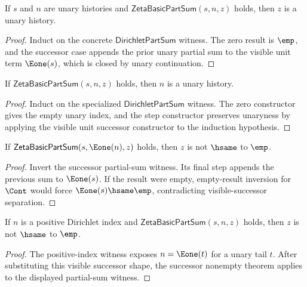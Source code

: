 \begin{theorem}
\label{thm:zeta-basic-part-sum-unary-result}
If \(s\) and \(n\) are unary histories and \(\mathsf{ZetaBasicPartSum}(s,n,z)\) holds, then \(z\) is a unary history.
\end{theorem}
\begin{proof}
Induct on the concrete \(\mathsf{DirichletPartSum}\) witness. The zero result is \(\emp\), and the successor case appends the prior unary partial sum to the visible unit term \(\Eone(s)\), which is closed by unary continuation.
\end{proof}

\begin{theorem}
\label{thm:zeta-basic-part-sum-index-unary}
If \(\mathsf{ZetaBasicPartSum}(s,n,z)\) holds, then \(n\) is a unary history.
\end{theorem}
\begin{proof}
Induct on the specialized \(\mathsf{DirichletPartSum}\) witness. The zero
constructor gives the empty unary index, and the step constructor preserves
unaryness by applying the visible unit successor constructor to the induction
hypothesis.
\end{proof}

\begin{theorem}
\label{thm:zeta-basic-part-sum-successor-result-nonempty}
If \(\mathsf{ZetaBasicPartSum}(s,\Eone(n),z)\) holds, then \(z\) is not
\(\hsame\) to \(\emp\).
\end{theorem}
\begin{proof}
Invert the successor partial-sum witness. Its final step appends the previous
sum to \(\Eone(s)\). If the result were empty, empty-result inversion for
\(\Cont\) would force \(\Eone(s)\hsame\emp\), contradicting visible-successor
separation.
\end{proof}

\begin{theorem}
\label{thm:zeta-basic-part-sum-positive-index-result-nonempty}
If \(n\) is a positive Dirichlet index and
\(\mathsf{ZetaBasicPartSum}(s,n,z)\) holds, then \(z\) is not \(\hsame\)
to \(\emp\).
\end{theorem}
\begin{proof}
The positive-index witness exposes \(n=\Eone(t)\) for a unary tail \(t\).
After substituting this visible successor shape, the successor nonempty
theorem applies to the displayed partial-sum witness.
\end{proof}

